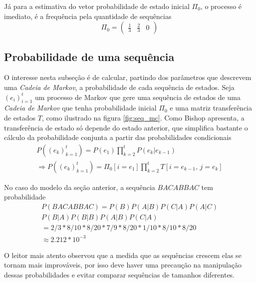 \documentclass{subfiles}
\begin{document}
Já para a estimativa do vetor probabilidade de estado inicial $\Pi_0$, o processo é imediato, é a frequência pela quantidade de sequências
\[
	\Pi_0 = \begin{pmatrix}
		\frac{1}{3} & \frac{2}{3} & 0
	\end{pmatrix}
\]

\subsection{Probabilidade de uma sequência}

O interesse nesta subseção é de calcular, partindo dos parâmetros que descrevem uma \textit{Cadeia de Markov}, a probabilidade de cada sequência de estados. Seja $(e_i)_{i=1}^t$ um processo de Markov que gere uma sequência de estados de uma \textit{Cadeia de Markov} que tenha probabilidade inicial $\Pi_0$ e uma matriz transferência de estados $T$, como ilustrado na figura \ref{fig:seq_mc}. Como Bishop \autocite{Bishop:2006pat} apresenta, a transferência de estado só depende do estado anterior, que simplifica bastante o cálculo da probabilidade conjunta a partir das probabilidades condicionais
\begin{gather*}
	P((e_k)_{k=1}^t) = P(e_1) \prod_{k=2}^t P(e_{k} \vert e_{k-1}) \\
	\Rightarrow P((e_k)_{k=1}^t) = \Pi_0[i=e_1] \prod_{k=2}^t T[i=e_{k-1},\, j=e_{k}]
\end{gather*}

No caso do modelo da seção anterior, a sequência $BACABBAC$ tem probabilidade
\begin{gather*}
	P(BACABBAC) = P(B) P(A|B) P(C|A) P(A|C) \\
	P(B|A) P(B|B) P(A|B) P(C|A) \\
	= 2/3 * 8/10 * 8/20 * 7/9 * 8/20 * 1/10 * 8/10 * 8/20
	\\  \approx 2.212 * 10^{-3}
\end{gather*}

O leitor mais atento observou que a medida que as sequências crescem elas se tornam mais improváveis, por isso deve haver uma precaução na manipulação dessas probabilidades e evitar comparar sequências de tamanhos diferentes.

\end{document}
